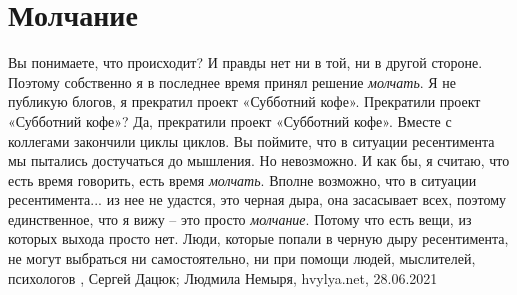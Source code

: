  
 
 
 
 
\chapter{Молчание}

Вы понимаете, что происходит? И правды нет ни в той, ни в другой стороне.
Поэтому собственно я в последнее время принял решение \emph{молчать}. Я не публикую
блогов, я прекратил проект «Субботний кофе».  Прекратили проект «Субботний
кофе»?  Да, прекратили проект «Субботний кофе». Вместе с коллегами закончили
циклы циклов. Вы поймите, что в ситуации ресентимента мы пытались достучаться
до мышления. Но невозможно. И как бы, я считаю, что есть время говорить, есть
время \emph{молчать}. Вполне возможно, что в ситуации ресентимента... из нее не удастся,
это черная дыра, она засасывает всех, поэтому единственное, что я вижу – это
просто \emph{молчание}. Потому что есть вещи, из которых выхода просто нет. Люди,
которые попали в черную дыру ресентимента, не могут выбраться ни
самостоятельно, ни при помощи людей, мыслителей, психологов
, 
Сергей Дацюк; Людмила Немыря, hvylya.net, 28.06.2021

